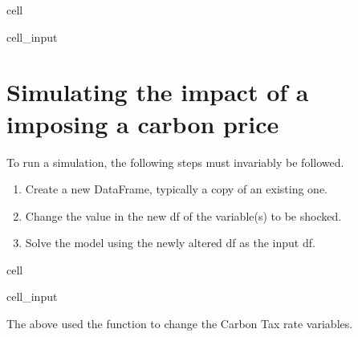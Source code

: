 \documentclass[letterpaper,10pt,english]{jupyterBook}
\begin{document}
\begin{sphinxuseclass}{cell}
\begin{sphinxVerbatimInput}
\begin{sphinxuseclass}{cell_input}
\end{sphinxuseclass}\end{sphinxVerbatimInput}

\end{sphinxuseclass}

\section{Simulating the impact of a imposing a carbon price}
\label{\detokenize{content/05_WBModels/MoreComplexScenarios:simulating-the-impact-of-a-imposing-a-carbon-price}}
\sphinxAtStartPar
To run a simulation, the following steps must invariably be followed.
\begin{enumerate}
%
\item {} 
\sphinxAtStartPar
Create a new DataFrame, typically a copy of an existing one.

\item {} 
\sphinxAtStartPar
Change the value  in the new df of the variable(s) to be shocked.

\item {} 
\sphinxAtStartPar
Solve the model using the newly altered df as the input df.

\end{enumerate}

\begin{sphinxuseclass}{cell}\begin{sphinxVerbatimInput}

\begin{sphinxuseclass}{cell_input}
\begin{sphinxVerbatim}[commandchars=\\\{\}]
  
\PYG{p}{[}\PYG{p}{[} \PYG{p}{]}\PYG{p}{]}   
\end{sphinxVerbatim}

\end{sphinxuseclass}\end{sphinxVerbatimInput}

\end{sphinxuseclass}
\sphinxAtStartPar
The above used the  function  to change the Carbon Tax rate variables.
\end{document}
